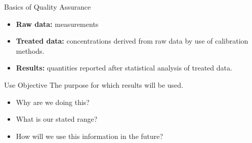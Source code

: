 \documentclass[notes=show]{beamer}
\begin{document}
\begin{frame}{Basics of Quality Assurance}
	\begin{itemize}
		\item \textbf{Raw data:} measurements
		\item \textbf{Treated data:} concentrations derived from raw
			data \alert{by use of calibration methods}.
		\item \textbf{Results:} quantities reported \alert{after
			statistical analysis} of treated data.
	\end{itemize}

	\begin{block}{Use Objective}
		The purpose for which results will be used.

		\begin{itemize}
			\item Why are we doing this?
			\item What is our stated range?
			\item How will we use this information in the future?
		\end{itemize}
	\end{block}
\end{frame}
\end{document}
